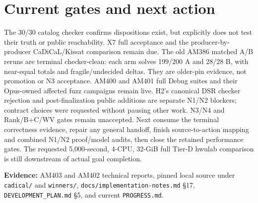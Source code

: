 \documentclass[11pt]{article}
\newcommand{\code}[1]{\texttt{#1}}
\begin{document}
\section*{Current gates and next action}
The 30/30 catalog checker confirms dispositions exist, but explicitly does not test their truth or public reachability. X7 full acceptance and the producer-by-producer CaDiCaL/Kissat comparison remain due. The old AM386 matched A/B reruns are terminal checker-clean: each arm solves 199/200 A and 28/28 B, with near-equal totals and fragile/undecided deltas. They are older-pin evidence, not promotion or N3 acceptance. AM400 and AM401 full Debug suites and their Opus-owned affected fuzz campaigns remain live. H2's canonical DSR checker rejection and post-finalization public additions are separate N1/N2 blockers; contract choices were requested without pausing other work. N3/N4 and Rank/B+C/WV gates remain unaccepted. Next consume the terminal correctness evidence, repair any general handoff, finish source-to-action mapping and combined N1/N2 proof/model audits, then close the retained performance gates. The requested 5,000-second, 4-CPU, 32-GiB full Tier-D hwulab comparison is still downstream of actual goal completion.

\noindent\textbf{Evidence:} AM403 and AM402 technical reports, pinned local source under \code{cadical/} and \code{winners/}, \code{docs/implementation-notes.md} \S17, \code{DEVELOPMENT\_PLAN.md} \S5, and current \code{PROGRESS.md}.
\end{document}
